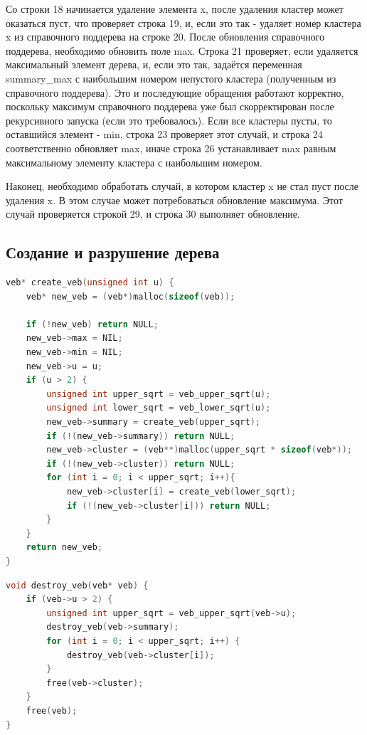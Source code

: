 \documentclass{article}
\begin{document}
Со строки 18 начинается удаление элемента x, после удаления кластер может оказаться пуст, что проверяет строка 19, и, если это так - удаляет номер кластера x из справочного поддерева на строке 20. После обновления справочного поддерева, необходимо обновить поле max. Строка 21 проверяет, если удаляется максимальный элемент дерева, и, если это так, задаётся переменная summary\_max с наибольшим номером непустого кластера (полученным из справочного поддерева). Это и последующие обращения работают корректно, поскольку максимум справочного поддерева уже был скорректирован после рекурсивного запуска (если это требовалось). Если все кластеры пусты, то оставшийся элемент - min, строка 23 проверяет этот случай, и строка 24 соответственно обновляет max, иначе строка 26 устанавливает max равным максимальному элементу кластера с наибольшим номером.

Наконец, необходимо обработать случай, в котором кластер x не стал пуст после удаления x. В этом случае может потребоваться обновление максимума. Этот случай проверяется строкой 29, и строка 30 выполняет обновление. \cite{ita}




\subsection{Создание и разрушение дерева}
\begin{lstlisting}[language=C,style=C]
veb* create_veb(unsigned int u) {
    veb* new_veb = (veb*)malloc(sizeof(veb));
    
    if (!new_veb) return NULL;
    new_veb->max = NIL;
    new_veb->min = NIL;
    new_veb->u = u;
    if (u > 2) {
        unsigned int upper_sqrt = veb_upper_sqrt(u);
        unsigned int lower_sqrt = veb_lower_sqrt(u);
        new_veb->summary = create_veb(upper_sqrt);
        if (!(new_veb->summary)) return NULL;
        new_veb->cluster = (veb**)malloc(upper_sqrt * sizeof(veb*));
        if (!(new_veb->cluster)) return NULL;
        for (int i = 0; i < upper_sqrt; i++){
            new_veb->cluster[i] = create_veb(lower_sqrt);
            if (!(new_veb->cluster[i])) return NULL;
        }
    }
    return new_veb;
}
\end{lstlisting}
\begin{lstlisting}[language=C,style=C]
void destroy_veb(veb* veb) {
    if (veb->u > 2) {
        unsigned int upper_sqrt = veb_upper_sqrt(veb->u);
        destroy_veb(veb->summary);
        for (int i = 0; i < upper_sqrt; i++) {
            destroy_veb(veb->cluster[i]);
        }
        free(veb->cluster);
    }
    free(veb);
}
\end{lstlisting}
\end{document}

